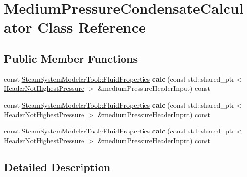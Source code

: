 \hypertarget{class_medium_pressure_condensate_calculator}{}\section{Medium\+Pressure\+Condensate\+Calculator Class Reference}
\label{class_medium_pressure_condensate_calculator}
\subsection*{Public Member Functions}
\begin{DoxyCompactItemize}
\item 
\mbox{\label{class_medium_pressure_condensate_calculator_a737339dd162b4ed164382a22869a4955}} 
const \hyperlink{struct_steam_system_modeler_tool_1_1_fluid_properties}{Steam\+System\+Modeler\+Tool\+::\+Fluid\+Properties} {\bfseries calc} (const std\+::shared\+\_\+ptr$<$ \hyperlink{class_header_not_highest_pressure}{Header\+Not\+Highest\+Pressure} $>$ \&medium\+Pressure\+Header\+Input) const
\item 
\mbox{\label{class_medium_pressure_condensate_calculator_a737339dd162b4ed164382a22869a4955}} 
const \hyperlink{struct_steam_system_modeler_tool_1_1_fluid_properties}{Steam\+System\+Modeler\+Tool\+::\+Fluid\+Properties} {\bfseries calc} (const std\+::shared\+\_\+ptr$<$ \hyperlink{class_header_not_highest_pressure}{Header\+Not\+Highest\+Pressure} $>$ \&medium\+Pressure\+Header\+Input) const
\item 
\mbox{\label{class_medium_pressure_condensate_calculator_a737339dd162b4ed164382a22869a4955}} 
const \hyperlink{struct_steam_system_modeler_tool_1_1_fluid_properties}{Steam\+System\+Modeler\+Tool\+::\+Fluid\+Properties} {\bfseries calc} (const std\+::shared\+\_\+ptr$<$ \hyperlink{class_header_not_highest_pressure}{Header\+Not\+Highest\+Pressure} $>$ \&medium\+Pressure\+Header\+Input) const
\end{DoxyCompactItemize}


\subsection{Detailed Description}


